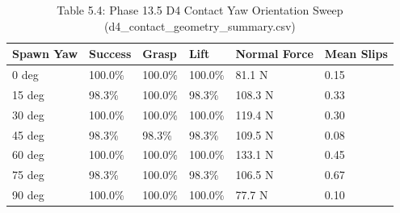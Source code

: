 \documentclass[11pt,a4paper,oneside]{book}
\begin{document}
\begin{longtable}{l l l l l l}\caption{Table 5.4: Phase 13.5 D4 Contact Yaw Orientation Sweep (d4\_contact\_geometry\_summary.csv)}\\\toprule
Spawn Yaw & Success & Grasp & Lift & Normal Force & Mean Slips \\ \midrule \endhead
0 deg & 100.0\% & 100.0\% & 100.0\% & 81.1 N & 0.15 \\
15 deg & 98.3\% & 100.0\% & 98.3\% & 108.3 N & 0.33 \\
30 deg & 100.0\% & 100.0\% & 100.0\% & 119.4 N & 0.30 \\
45 deg & 98.3\% & 98.3\% & 98.3\% & 109.5 N & 0.08 \\
60 deg & 100.0\% & 100.0\% & 100.0\% & 133.1 N & 0.45 \\
75 deg & 98.3\% & 100.0\% & 98.3\% & 106.5 N & 0.67 \\
90 deg & 100.0\% & 100.0\% & 100.0\% & 77.7 N & 0.10 \\
\bottomrule \end{longtable}
\end{document}
